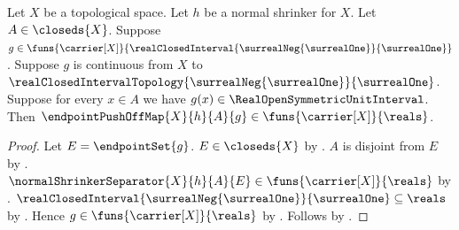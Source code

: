 \begin{theorem}\label{endpoint_push_off_map_typed_real}
    Let $X$ be a topological space.
    Let $h$ be a normal shrinker for $X$.
    Let $A\in\closeds{X}$.
    Suppose
        $g\in\funs{\carrier[X]}
            {\realClosedInterval
                {\surrealNeg{\surrealOne}}{\surrealOne}}$.
    Suppose $g$ is continuous from $X$ to
        $\realClosedIntervalTopology
            {\surrealNeg{\surrealOne}}{\surrealOne}$.
    Suppose for every $x\in A$ we have
        $g(x)\in\RealOpenSymmetricUnitInterval$.
    Then $\endpointPushOffMap{X}{h}{A}{g}
        \in\funs{\carrier[X]}{\reals}$.
\end{theorem}
\begin{proof}
    Let $E=\endpointSet{g}$.
    $E\in\closeds{X}$ by .
    $A$ is disjoint from $E$
        by .
    $\normalShrinkerSeparator{X}{h}{A}{E}
        \in\funs{\carrier[X]}{\reals}$
        by .
    $\realClosedInterval
        {\surrealNeg{\surrealOne}}{\surrealOne}\subseteq\reals$
        by .
    Hence $g\in\funs{\carrier[X]}{\reals}$
        by .
    Follows by
        .
\end{proof}

